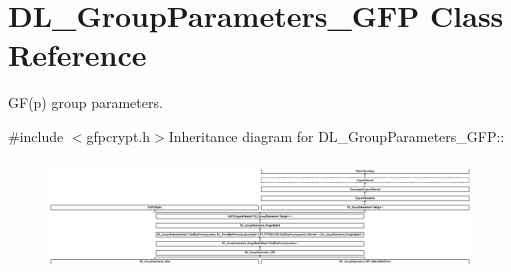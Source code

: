 \hypertarget{class_d_l___group_parameters___g_f_p}{
\section{DL\_\-GroupParameters\_\-GFP Class Reference}
\label{class_d_l___group_parameters___g_f_p}
}


GF(p) group parameters.  


{\ttfamily \#include $<$gfpcrypt.h$>$}Inheritance diagram for DL\_\-GroupParameters\_\-GFP::\begin{figure}[H]
\begin{center}
\leavevmode
\includegraphics[height=2.94455cm]{class_d_l___group_parameters___g_f_p}
\end{center}
\end{figure}
